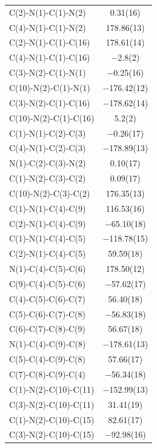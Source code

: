 \pagebreak
\begin{center}
\tablefirsthead{%
\toprule}
\tablelasttail{\bottomrule}
{\footnotesize \singlespacing
\begin{supertabular}{p{1.5in}c}
C(2)-N(1)-C(1)-N(2)&0.31(16)\\
C(4)-N(1)-C(1)-N(2)&178.86(13)\\
C(2)-N(1)-C(1)-C(16)&178.61(14)\\
C(4)-N(1)-C(1)-C(16)&$-$2.8(2)\\
C(3)-N(2)-C(1)-N(1)&$-$0.25(16)\\
C(10)-N(2)-C(1)-N(1)&$-$176.42(12)\\
C(3)-N(2)-C(1)-C(16)&$-$178.62(14)\\
C(10)-N(2)-C(1)-C(16)&5.2(2)\\
C(1)-N(1)-C(2)-C(3)&$-$0.26(17)\\
C(4)-N(1)-C(2)-C(3)&$-$178.89(13)\\
N(1)-C(2)-C(3)-N(2)&0.10(17)\\
C(1)-N(2)-C(3)-C(2)&0.09(17)\\
C(10)-N(2)-C(3)-C(2)&176.35(13)\\
C(1)-N(1)-C(4)-C(9)&116.53(16)\\
C(2)-N(1)-C(4)-C(9)&$-$65.10(18)\\
C(1)-N(1)-C(4)-C(5)&$-$118.78(15)\\
C(2)-N(1)-C(4)-C(5)&59.59(18)\\
N(1)-C(4)-C(5)-C(6)&178.50(12)\\
C(9)-C(4)-C(5)-C(6)&$-$57.62(17)\\
C(4)-C(5)-C(6)-C(7)&56.40(18)\\
C(5)-C(6)-C(7)-C(8)&$-$56.83(18)\\
C(6)-C(7)-C(8)-C(9)&56.67(18)\\
N(1)-C(4)-C(9)-C(8)&$-$178.61(13)\\
C(5)-C(4)-C(9)-C(8)&57.66(17)\\
C(7)-C(8)-C(9)-C(4)&$-$56.34(18)\\
C(1)-N(2)-C(10)-C(11)&$-$152.99(13)\\
C(3)-N(2)-C(10)-C(11)&31.41(19)\\
C(1)-N(2)-C(10)-C(15)&82.61(17)\\
C(3)-N(2)-C(10)-C(15)&$-$92.98(16)\\

\end{supertabular}}
\end{center}
